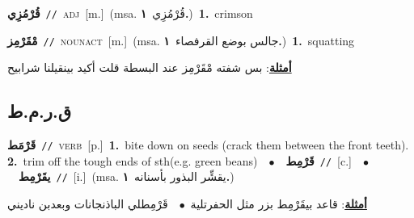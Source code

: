 \documentclass[10pt,a4paper,twoside]{article} %
\begin{document}
\begin{multicols}{2}
{\setlength\topsep{0pt}\textbf{\foreignlanguage{arabic}{قُرْمُزِي}}\ {\color{gray}\texttt{//}\color{black}}\ \textsc{adj}\ [m.]\ \color{gray}(msa. \foreignlanguage{arabic}{قُرْمُزِي}~\foreignlanguage{arabic}{\textbf{١.}})\color{black}\ \textbf{1.}~crimson\ } \vspace{2mm}

{\setlength\topsep{0pt}\textbf{\foreignlanguage{arabic}{مْقَرْمِز}}\ {\color{gray}\texttt{//}\color{black}}\ \textsc{noun\textunderscore act}\ [m.]\ \color{gray}(msa. \foreignlanguage{arabic}{جالس بوضع القرفصاء}~\foreignlanguage{arabic}{\textbf{١.}})\color{black}\ \textbf{1.}~squatting\  \begin{flushright}\color{gray}\foreignlanguage{arabic}{\textbf{\underline{\foreignlanguage{arabic}{أمثلة}}}: بس شفته مْقَرْمِز عند البسطة قلت أكيد بينقيلنا شرابيح}\end{flushright}\color{black}} \vspace{2mm}

\vspace{-3mm}
\subsection*{\color{blue}\foreignlanguage{arabic}{ق.ر.م.ط}\color{blue}{}} 

{\setlength\topsep{0pt}\textbf{\foreignlanguage{arabic}{قَرْمَط}}\ {\color{gray}\texttt{//}\color{black}}\ \textsc{verb}\ [p.]\ \textbf{1.}~bite down on seeds (crack them between the front teeth).  \textbf{2.}~trim off the tough ends of sth(e.g. green beans)\ \ $\bullet$\ \ \setlength\topsep{0pt}\textbf{\foreignlanguage{arabic}{قَرْمِط}}\ {\color{gray}\texttt{//}\color{black}}\ [c.]\ \ $\bullet$\ \ \setlength\topsep{0pt}\textbf{\foreignlanguage{arabic}{يقَرْمِط}}\ {\color{gray}\texttt{//}\color{black}}\ [i.]\ \color{gray}(msa. \foreignlanguage{arabic}{يقشِّر البذور بأسنانه}~\foreignlanguage{arabic}{\textbf{١.}})\color{black}\  \begin{flushright}\color{gray}\foreignlanguage{arabic}{\textbf{\underline{\foreignlanguage{arabic}{أمثلة}}}: قاعد بيقَرْمِط بزر مثل الحفرتلية\ $\bullet$\ \  قَرْمِطلي الباذنجانات وبعدبن ناديني}\end{flushright}\color{black}} \vspace{2mm}


\end{multicols}
\end{document}
